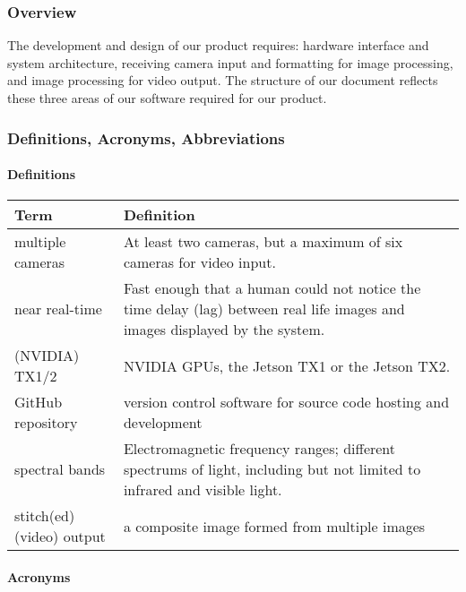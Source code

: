 \subsubsection{Overview}

The development and design of our product requires: hardware interface and system 
architecture, receiving camera input and formatting for image processing, and image 
processing for video output. The structure of our document reflects these three areas 
of our software required for our product. \\ 

\newpage

\subsubsection{Definitions, Acronyms, Abbreviations}

\paragraph{Definitions}

\begin{tabular}{|l|p{11cm}|}
	\hline
	\textbf{Term} & \textbf{Definition}\\
	\hline
	multiple cameras & At least two cameras, but a maximum of six cameras for 
	video input.\\
	\hline
	near real-time & Fast enough that a human could not notice the time 
	delay (lag) between \newline real life images and images displayed by the system.\\
	\hline
	(NVIDIA) TX1/2 & NVIDIA GPUs, the Jetson TX1 or the Jetson TX2.\\
	\hline
	GitHub repository & version control software for source code hosting and development\\
	\hline
	spectral bands & Electromagnetic frequency ranges; different 
	spectrums of light, including \newline but not limited to infrared 
	and visible light.\\
	\hline
	stitch(ed) (video) output & a composite image formed from multiple images\\
	\hline
\end{tabular}

\paragraph{Acronyms}

